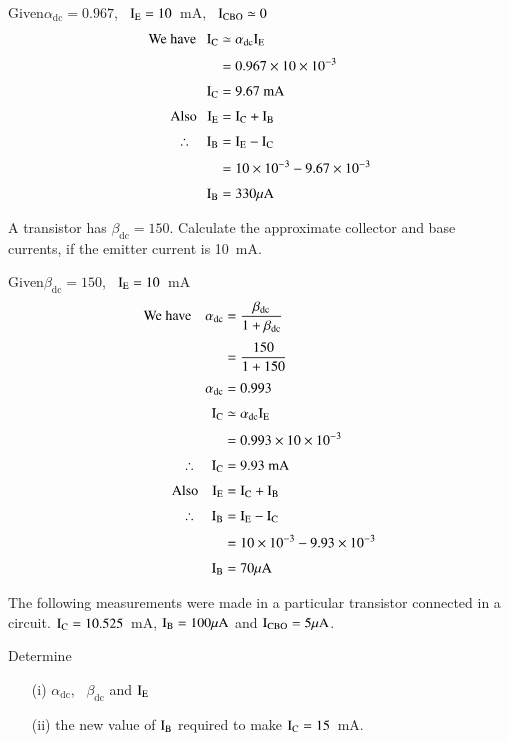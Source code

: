 \begin{solution}
Given\quad $\alpha_{\text{dc}}=0.967$, \ $\textrm{I}_{\textrm{E}}=10$~mA, \ $\textrm{I}_{\text{CBO}}\simeq 0$
\begin{align*}
\text{We have~~ } \textrm{I}_{\textrm{C}} &\simeq \alpha_{\text{dc}}\textrm{I}_{\textrm{E}}\\[3pt]
&= 0.967\times 10\times 10^{-3}\\[3pt]
\textrm{I}_{\textrm{C}} &= 9.67\text{~mA}\\[3pt]
\text{Also~~ } \textrm{I}_{\textrm{E}} &= \textrm{I}_{\textrm{C}}+\textrm{I}_{\textrm{B}}\\[3pt]
\therefore\quad \textrm{I}_{\textrm{B}} &= \textrm{I}_{\textrm{E}}-\textrm{I}_{\textrm{C}}\\[3pt]
&= 10\times 10^{-3}-9.67\times 10^{-3}\\[3pt]
\textrm{I}_{\textrm{B}} &= 330\mu\textrm{A}
\end{align*}
\end{solution}

\begin{problem}\label{prob2.8}
A transistor has $\beta_{\text{dc}}=150$. Calculate the approximate collector and base currents, if the emitter current is 10~mA.
\end{problem}

\begin{solution}
Given\quad $\beta_{\text{dc}}=150$, \ $\textrm{I}_{\textrm{E}}=10$~mA
\begin{align*}
\text{We have}\quad \alpha_{\text{dc}} &= \dfrac{\beta_{\text{dc}}}{1+\beta_{\text{dc}}}\\[3pt]
&= \frac{150}{1+150}\\[3pt]
\alpha_{\text{dc}} &= 0.993\\[3pt]
\textrm{I}_{\textrm{C}} &\simeq \alpha_{\text{dc}}\textrm{I}_{\textrm{E}}\\[3pt]
&= 0.993\times 10\times 10^{-3}\\[3pt]
\therefore\quad \textrm{I}_{\textrm{C}} &= 9.93\text{~mA}\\[3pt]
\text{Also}\quad \textrm{I}_{\textrm{E}} &= \textrm{I}_{\textrm{C}}+\textrm{I}_{\textrm{B}}\\[3pt]
\therefore\quad \textrm{I}_{\textrm{B}} &= \textrm{I}_{\textrm{E}}-\textrm{I}_{\textrm{C}}\\[3pt]
&= 10\times 10^{-3}-9.93\times 10^{-3}\\[3pt]
\textrm{I}_{\textrm{B}} &= 70\mu\textrm{A}
\end{align*}
\end{solution}

\begin{problem}\label{prob2.9}
The following measurements were made in a particular transistor connected in a circuit. $\textrm{I}_{\textrm{C}}=10.525$~mA, $\textrm{I}_{\textrm{B}}=100\mu\textrm{A}$ and $\textrm{I}_{\text{CBO}}=5\mu\textrm{A}$.

Determine
\begin{itemize}
\item[(i)] $\alpha_{\text{dc}}$, \ $\beta_{\text{dc}}$ and $\textrm{I}_{\textrm{E}}$

\item[(ii)] the new value of $\textrm{I}_{\textrm{B}}$ required to make $\textrm{I}_{\textrm{C}}=15$~mA.
\end{itemize}
\end{problem}

